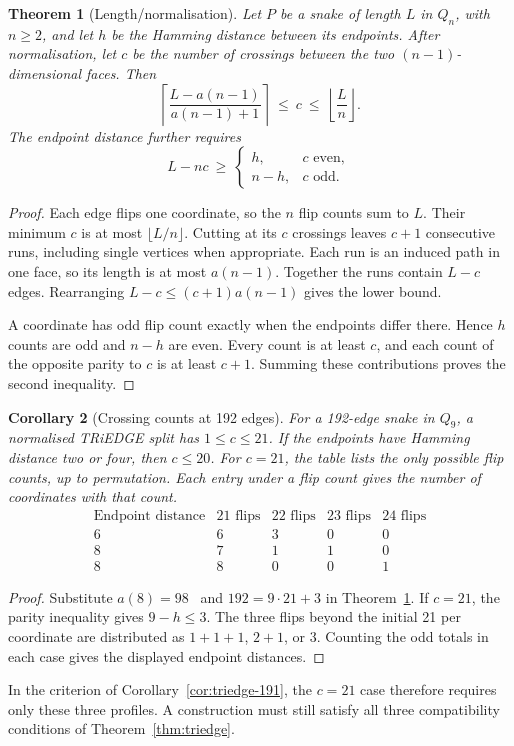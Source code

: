 \documentclass[11pt,a4paper]{article}
\newtheorem{theorem}{Theorem}[section]
\newtheorem{corollary}[theorem]{Corollary}
\theoremstyle{definition}
\theoremstyle{remark}
\newcommand{\Q}{Q}
\begin{document}
\begin{theorem}[Length/normalisation]\label{thm:length-normalization}
Let $P$ be a snake of length $L$ in $\Q_n$, with $n\ge2$, and let $h$ be
the Hamming distance between its endpoints. After normalisation, let $c$
be the number of crossings between the two $(n-1)$-dimensional faces.
Then
\[
 \left\lceil\frac{L-a(n-1)}{a(n-1)+1}\right\rceil
 \ \le\ c\ \le\ \left\lfloor\frac{L}{n}\right\rfloor .
\]
The endpoint distance further requires
\[
 L-nc\ \ge\
 \begin{cases}
 h,   & c\text{ even},\\
 n-h, & c\text{ odd}.
 \end{cases}
\]
\end{theorem}
\begin{proof}
Each edge flips one coordinate, so the $n$ flip counts sum to $L$.
Their minimum $c$ is at most $\lfloor L/n\rfloor$. Cutting at its $c$
crossings leaves $c+1$ consecutive runs, including single vertices when
appropriate. Each run is an induced path in one face, so its length is
at most $a(n-1)$. Together the runs contain $L-c$ edges. Rearranging
$L-c\le(c+1)a(n-1)$ gives the lower bound.

A coordinate has odd flip count exactly when the endpoints differ there.
Hence $h$ counts are odd and $n-h$ are even. Every count is at least
$c$, and each count of the opposite parity to $c$ is at least $c+1$.
Summing these contributions proves the second inequality.
\end{proof}

\begin{corollary}[Crossing counts at 192 edges]\label{cor:length-normalization-192}
For a 192-edge snake in $\Q_9$, a normalised TRiEDGE split has
$1\le c\le21$. If the endpoints have Hamming distance two or four,
then $c\le20$. For $c=21$, the table lists the only possible flip counts, up to
permutation. Each entry under a flip count gives the number of coordinates
with that count.
\[
\begin{array}{c|rrrr}
\text{Endpoint distance} & \text{21 flips} & \text{22 flips}
                         & \text{23 flips} & \text{24 flips}\\ \hline
6 & 6 & 3 & 0 & 0\\
8 & 7 & 1 & 1 & 0\\
8 & 8 & 0 & 0 & 1
\end{array}
\]
\end{corollary}
\begin{proof}
Substitute $a(8)=98$~\cite{ostergard} and $192=9\cdot21+3$ in
Theorem~\ref{thm:length-normalization}. If $c=21$, the parity inequality
gives $9-h\le3$. The three flips beyond the initial 21 per coordinate
are distributed as $1+1+1$, $2+1$, or $3$. Counting the odd totals in
each case gives the displayed endpoint distances.
\end{proof}
In the criterion of Corollary~\ref{cor:triedge-191}, the $c=21$ case
therefore requires only these three profiles. A construction must
still satisfy all three compatibility conditions of
Theorem~\ref{thm:triedge}.
\end{document}
